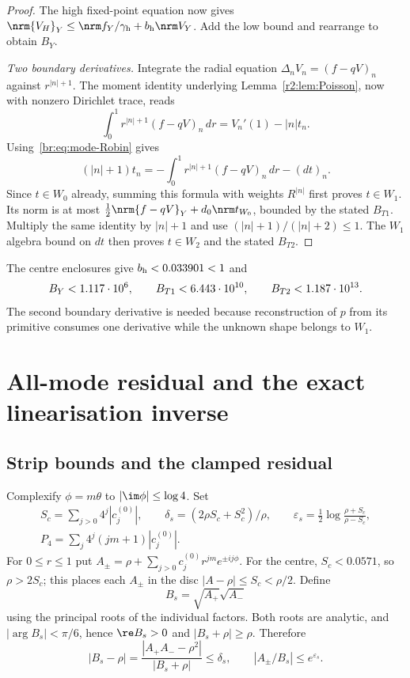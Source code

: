 \begin{proof}
The high fixed-point equation now gives
$\nrm{V_H}_Y\le\nrm f_Y/\gamma_{\rm h}+b_{\rm h}\nrm V_Y$.
Add the low bound and rearrange to obtain $B_Y$.

\emph{Two boundary derivatives.}
Integrate the radial equation $\Delta_nV_n=(f-qV)_n$ against
$r^{|n|+1}$. The moment identity underlying
Lemma~\ref{r2:lem:Poisson}, now with nonzero Dirichlet trace, reads
\[
 \int_0^1r^{|n|+1}(f-qV)_n\,dr=V_n'(1)-|n|t_n.
\]
Using~\eqref{br:eq:mode-Robin} gives
\begin{equation}\label{br:eq:trace-identity}
 (|n|+1)t_n=-\int_0^1r^{|n|+1}(f-qV)_n\,dr-(dt)_n.
\end{equation}
Since $t\in W_0$ already, summing this formula with weights $R^{|n|}$
first proves $t\in W_1$. Its norm is at most
$\tfrac12\nrm{f-qV}_Y+d_0\nrm t_{W_0}$, bounded by the stated $B_{T1}$.
Multiply the same identity by $|n|+1$ and use
$(|n|+1)/(|n|+2)\le1$. The $W_1$ algebra bound on $dt$ then proves
$t\in W_2$ and the stated $B_{T2}$.
\end{proof}

The centre enclosures give $b_{\rm h}<0.033901<1$ and
\begin{equation}\label{br:eq:transfer-numbers}
 B_Y<1.117\cdot10^6,\qquad B_{T1}<6.443\cdot10^{10},\qquad B_{T2}<1.187\cdot10^{13}.
\end{equation}
The second boundary derivative is needed because reconstruction of $p$
from its primitive consumes one derivative while the unknown shape
belongs to $W_1$.
\section{All-mode residual and the exact linearisation inverse}\label{br:sec:inverse}
\subsection{Strip bounds and the clamped residual}\label{br:sec:residual}
Complexify $\phi=m\theta$ to $|\im\phi|\le\log4$. Set
\begin{equation}\label{br:eq:strip-data}
 \begin{gathered}
 S_c=\sum_{j>0}4^j|c_j^{(0)}|,\qquad
 \delta_s=(2\rho S_c+S_c^2)/\rho,\qquad
 \varepsilon_s=\tfrac12\log\frac{\rho+S_c}{\rho-S_c},\\
 P_4=\sum_j4^j(jm+1)|c_j^{(0)}|.
 \end{gathered}
\end{equation}
For $0\le r\le1$ put
$A_\pm=\rho+\sum_{j>0}c_j^{(0)}r^{jm}e^{\pm ij\phi}$.
For the centre, $S_c<0.0571$, so $\rho>2S_c$; this places each $A_\pm$ in the disc
$|A-\rho|\le S_c<\rho/2$. Define
\begin{equation}\label{br:eq:strip-root}
 B_s=\sqrt{A_+}\sqrt{A_-}
\end{equation}
using the principal roots of the individual factors. Both roots are
analytic, and $|\arg B_s|<\pi/6$, hence $\re B_s>0$ and
$|B_s+\rho|\ge\rho$. Therefore
\begin{equation}\label{br:eq:strip-geometry}
 |B_s-\rho|=\frac{|A_+A_--\rho^2|}{|B_s+\rho|}\le\delta_s,
 \qquad |A_\pm/B_s|\le e^{\varepsilon_s}.
\end{equation}

